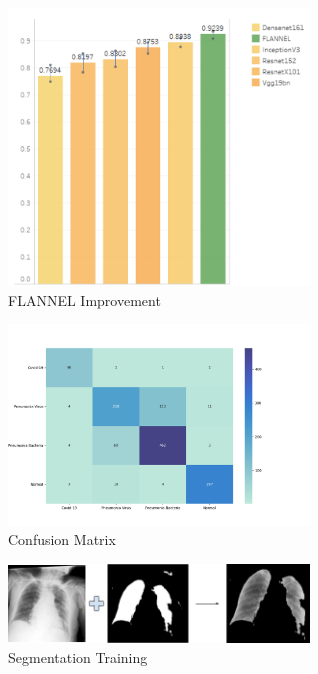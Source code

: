 \documentclass{sigkddExp}
\begin{document}
\begin{figure}[h]
    \includegraphics[width=8cm]{../doc/images/F1Score_vs_rest.png}
    \caption{FLANNEL Improvement}
    \label{fig:f1score}
\end{figure}


\begin{figure}[h]
    \includegraphics[width=8cm]{../doc/images/confusion_matrix.png}
    \caption{Confusion Matrix}
    \label{fig:cfmatrix}
\end{figure}

\begin{figure}[h]
    \includegraphics[width=8cm]{../doc/images/segmentation_training.png}
    \caption{Segmentation Training}
    \label{fig:segtrain}
\end{figure}


\newpage
%

\end{document}
